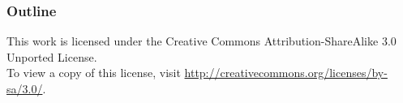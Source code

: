 
\begin{frame}[t]

\frametitle{Outline}


\tableofcontents[hideallsubsections]

\vspace*{2em}

\begin{center}


\scriptsize This work is licensed under the Creative Commons
Attribution-ShareAlike 3.0 Unported License.\\ To view a copy
of this license, visit
\url{http://creativecommons.org/licenses/by-sa/3.0/}.

\end{center}
\end{frame}

